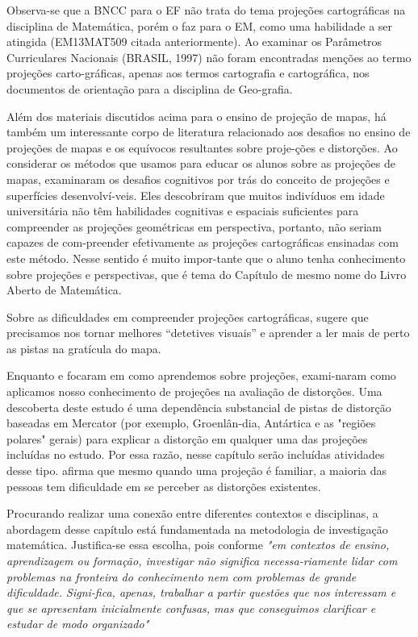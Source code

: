 \begin{apresentacao}
{Observa-se que a BNCC para o EF não trata do tema projeções cartográficas na disciplina de Matemática, porém o faz para o EM, como uma habilidade a ser atingida (EM13MAT509 citada anteriormente).  Ao examinar os Parâmetros Curriculares Nacionais (BRASIL, 1997) não foram encontradas menções ao termo projeções carto-gráficas, apenas aos termos cartografia e cartográfica, nos documentos de orientação para a disciplina de Geo-grafia. 

Além dos materiais discutidos acima para o ensino de projeção de mapas, há também um interessante corpo de literatura relacionado aos desafios no ensino de projeções de mapas e os equívocos resultantes sobre proje-ções e distorções. Ao considerar os métodos que usamos para educar os alunos sobre as projeções de mapas, \cite{Downs}  examinaram os desafios cognitivos por trás do conceito de projeções e superfícies desenvolví-veis. Eles descobriram que muitos indivíduos em idade universitária não têm habilidades cognitivas e espaciais suficientes para compreender as projeções geométricas em perspectiva, portanto, não seriam capazes de com-preender efetivamente as projeções cartográficas ensinadas com este método. Nesse sentido é muito impor-tante que o aluno tenha conhecimento sobre projeções e perspectivas, que é tema do Capítulo de mesmo nome do Livro Aberto de Matemática.

 Sobre as dificuldades em compreender projeções cartográficas, \cite{Olson} sugere que precisamos nos tornar melhores “detetives visuais” e aprender a ler mais de perto as pistas na gratícula do mapa.

Enquanto \cite{Downs} e \cite{Olson} focaram em como aprendemos sobre projeções, \cite{Battersby} exami-naram como aplicamos nosso conhecimento de projeções na avaliação de distorções. Uma descoberta deste estudo é uma dependência substancial de pistas de distorção baseadas em Mercator (por exemplo, Groenlân-dia, Antártica e as "regiões polares" gerais) para explicar a distorção em qualquer uma das projeções incluídas no estudo. Por essa razão, nesse capítulo serão incluídas atividades desse tipo. \cite{Battersby} afirma que mesmo quando uma projeção é familiar, a maioria das pessoas tem dificuldade em se perceber as distorções existentes.

Procurando realizar uma conexão entre diferentes contextos e disciplinas, a abordagem desse capítulo está fundamentada na metodologia de investigação matemática. Justifica-se essa escolha, pois conforme \cite[p.2]{Ponte} \textit{"em contextos de ensino, aprendizagem ou formação, investigar não significa necessa-riamente lidar com problemas na fronteira do conhecimento nem com problemas de grande dificuldade. Signi-fica, apenas, trabalhar a partir questões que nos interessam e que se apresentam inicialmente confusas, mas que conseguimos clarificar e estudar de modo organizado" }

}
\end{apresentacao}
